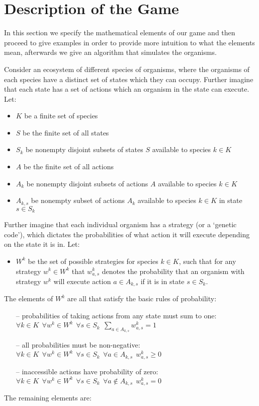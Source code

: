 \section{Description of the Game}\label{section:formalism}

In this section we specify the mathematical elements of our game and then proceed to give examples in order to provide more intuition to what the elements mean, afterwards we give an algorithm that simulates the organisms.

Consider an ecosystem of different species of organisms, where the organisms of each species have a distinct set of states which they can occupy. Further imagine that each state has a set of actions which an organism in the state can execute.
Let:
\begin{itemize}[leftmargin=*,labelsep=4mm]
\item   $K$ be a finite set of species
\item	$S$ be the finite set of all states
\item   $S_k$ be nonempty disjoint subsets of states $S$ available to species $k\in K$
\item   $A$ be the finite set of all actions
\item   $A_k$ be nonempty disjoint subsets of actions $A$ available to species $k\in K$
\item   $A_{k,s}$ be nonempty subset of actions $A_k$ available to species $k\in K$ in state $s\in S_k$
\end{itemize}
Further imagine that each individual organism has a strategy (or a `genetic code'), which dictates the probabilities of what action it will execute depending on the state it is in.
Let:

\begin{itemize}[leftmargin=*,labelsep=4mm]
\item   $W^k$ be the set of possible strategies for species $k\in K$, such that for any strategy $w^k \in W^k$ that $w^k_{a,s}$ denotes the probability that an organism with strategy $w^k$ will execute action $a\in A_{k,s}$ if it is in state $s\in S_k$.
\end{itemize}
The elements of $W^k$ are all that satisfy the basic rules of probability:
\begin{itemize}[leftmargin=*,labelsep=4mm]
\item[--]   probabilities of taking actions from any state must sum to one:\\\-\hspace{8mm} $\forall k\in K~~\forall w^k\in W^k~~\forall s\in S_k~~ \sum_{a\in A_{k,s}}w^k_{a,s}=1$
\item[--]   all probabilities must be non-negative:\\\-\hspace{8mm} $\forall k\in K~~\forall w^k\in W^k~~\forall s\in S_k~~\forall a\in A_{k,s}~~ w^k_{a,s}\ge 0$
\item[--]   inaccessible actions have probability of zero:\\\-\hspace{8mm} $\forall k\in K~~\forall w^k\in W^k~~\forall s\in S_k~~\forall a\notin A_{k,s}~~ w^k_{a,s}= 0$
\end{itemize}
The remaining elements are:

